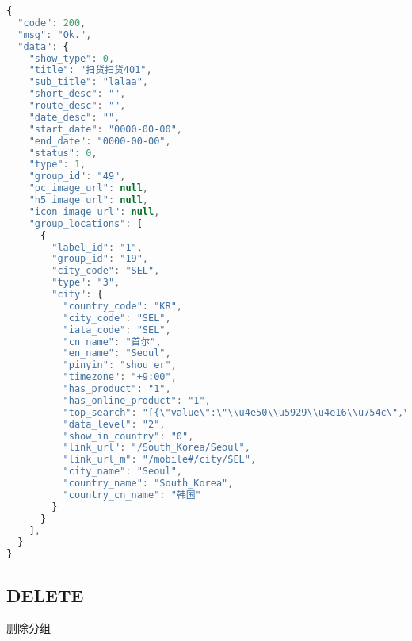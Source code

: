 \begin{lstlisting}[language=JavaScript]
{
  "code": 200,
  "msg": "Ok.",
  "data": {
    "show_type": 0,
    "title": "扫货扫货401",
    "sub_title": "lalaa",
    "short_desc": "",
    "route_desc": "",
    "date_desc": "",
    "start_date": "0000-00-00",
    "end_date": "0000-00-00",
    "status": 0,
    "type": 1,
    "group_id": "49",
    "pc_image_url": null,
    "h5_image_url": null,
    "icon_image_url": null,
    "group_locations": [
      {
        "label_id": "1",
        "group_id": "19",
        "city_code": "SEL",
        "type": "3",
        "city": {
          "country_code": "KR",
          "city_code": "SEL",
          "iata_code": "SEL",
          "cn_name": "首尔",
          "en_name": "Seoul",
          "pinyin": "shou er",
          "timezone": "+9:00",
          "has_product": "1",
          "has_online_product": "1",
          "top_search": "[{\"value\":\"\\u4e50\\u5929\\u4e16\\u754c\",\"display_order\":1},{\"value\":\"\\u6c11\\u4fd7\",\"display_order\":2},{\"value\":\"\\u4e71\\u6253\\u79c0\",\"display_order\":3},{\"value\":\"\\u660e\\u6d1e\",\"display_order\":4},{\"value\":\"\\u6c5d\\u77e3\\u5c9b\",\"display_order\":5},{\"value\":\"\\u4e1c\\u5927\\u95e8\",\"display_order\":6}]",
          "data_level": "2",
          "show_in_country": "0",
          "link_url": "/South_Korea/Seoul",
          "link_url_m": "/mobile#/city/SEL",
          "city_name": "Seoul",
          "country_name": "South_Korea",
          "country_cn_name": "韩国"
        }
      }
    ],
  }
}
\end{lstlisting}



\subsection{DELETE}

删除分组

